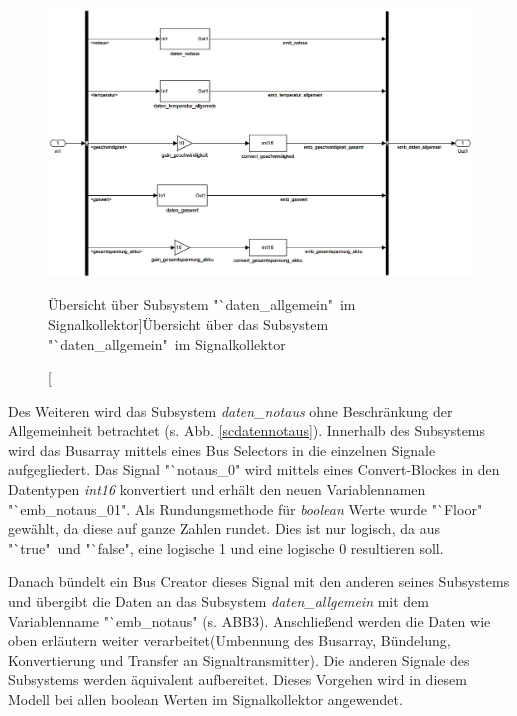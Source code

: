 \documentclass[fontsize = 12pt, paper = a4]{scrreprt}
\begin{document}
\begin{figure}[h]
\centering
\includegraphics[scale = 0.37]{sc_daten_allgemein}
\caption[Übersicht über Subsystem "`daten\_allgemein"\ im Signalkollektor]{Übersicht über das Subsystem "`daten\_allgemein"\ im Signalkollektor}
\label{scdatenallgemein}
\end{figure}

Des Weiteren wird das Subsystem \textit{daten\_notaus} ohne Beschränkung der Allgemeinheit betrachtet (s. Abb. \ref{scdatennotaus}). Innerhalb des Subsystems wird das Busarray mittels eines Bus Selectors in die einzelnen Signale aufgegliedert. Das Signal "`notaus\_0" wird mittels eines Convert-Blockes in den Datentypen \textit{int16} konvertiert und erhält den neuen Variablennamen "`emb\_notaus\_01". Als Rundungsmethode für \textit{boolean} Werte wurde "`Floor" gewählt, da diese auf ganze Zahlen rundet. Dies ist nur logisch, da aus "`true"\ und "`false", eine logische 1 und eine logische 0 resultieren soll.

\newpage

Danach bündelt ein Bus Creator dieses Signal mit den anderen seines Subsystems und übergibt die Daten an das Subsystem \textit{daten\_allgemein} mit dem Variablenname "`emb\_notaus" (s. ABB3). Anschließend werden die Daten wie oben erläutern weiter verarbeitet(Umbennung des Busarray, Bündelung, Konvertierung und Transfer an Signaltransmitter). Die anderen Signale des Subsystems werden äquivalent aufbereitet. Dieses Vorgehen wird in diesem Modell bei allen boolean Werten im Signalkollektor angewendet. \\
\end{document}
